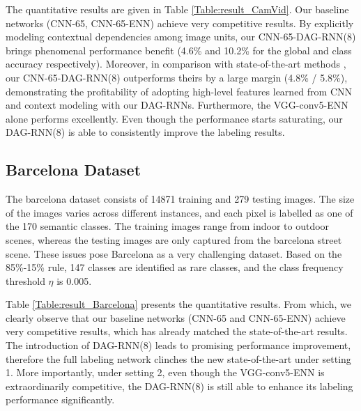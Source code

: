 \documentclass[10pt,twocolumn,letterpaper]{article}
\begin{document}
The quantitative results are given in Table \ref{Table:result_CamVid}. Our baseline networks (CNN-65, CNN-65-ENN) achieve very competitive results. By explicitly modeling contextual dependencies among image units, our CNN-65-DAG-RNN(8) brings phenomenal performance benefit (4.6\% and 10.2\% for the global and class accuracy respectively). Moreover, in comparison with state-of-the-art methods \cite{bulo2014neural}\cite{ladicky2010and}\cite{sturgess2009combining} \cite{tighe2013finding},  our CNN-65-DAG-RNN(8) outperforms theirs by a large margin (4.8\% / 5.8\%), demonstrating the profitability of adopting high-level features learned from CNN and context modeling with our DAG-RNNs.
Furthermore, the VGG-conv5-ENN alone performs excellently. Even though the performance starts saturating, our DAG-RNN(8) is able to consistently improve the labeling results.








\subsection{Barcelona Dataset}
The barcelona dataset \cite{tighe2010superparsing} consists of 14871 training
and 279 testing  images. The size of the images varies across different instances, and each pixel is labelled as one of the 170 semantic classes. The training images range from indoor to outdoor scenes, whereas the testing images are only captured from the barcelona street scene. These issues pose Barcelona as a very challenging dataset. Based on the 85\%-15\% rule, 147 classes are identified as rare classes, and the class frequency threshold $\eta$ is 0.005.

Table \ref{Table:result_Barcelona} presents the quantitative results. From which, we clearly observe that our baseline networks (CNN-65 and CNN-65-ENN) achieve very competitive results, which has already matched the state-of-the-art results. The introduction of DAG-RNN(8) leads to promising performance improvement, therefore the full labeling network clinches the new state-of-the-art under setting 1. More importantly, under setting 2, even though the VGG-conv5-ENN is extraordinarily competitive, the DAG-RNN(8) is still able to enhance its labeling performance significantly.
\end{document}
